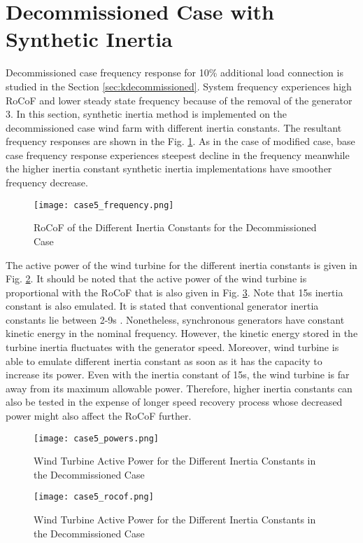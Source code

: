 \section{Decommissioned Case with Synthetic Inertia}
Decommissioned case frequency response for 10\% additional load connection is studied in the Section \ref{sec:kdecommissioned}. System frequency experiences high RoCoF and lower steady state frequency because of the removal of the generator 3. In this section, synthetic inertia method  is implemented on the decommissioned case wind farm with different inertia constants. The resultant frequency responses are shown in the Fig. \ref{Case5_freq}. As in the case of modified case, base case frequency response experiences steepest decline in the frequency meanwhile the higher inertia constant synthetic inertia implementations have smoother frequency decrease.\par
\begin{figure}[h]
	\centering
	\texttt{[image: case5\_frequency.png]}
	\caption{RoCoF of the Different Inertia Constants for the Decommissioned Case}
	\label{Case5_freq}
\end{figure}
The active power of the wind turbine for the different inertia constants is given in Fig. \ref{Case5_power}. It should be noted that the active power of the wind turbine is proportional with the RoCoF that is also given in Fig. \ref{Case5_rocof}. Note that 15s inertia constant is also emulated. It is stated that conventional generator inertia constants lie between 2-9s \cite{Kundur}. Nonetheless, synchronous generators have constant kinetic energy in the nominal frequency. However, the kinetic energy stored in the turbine inertia fluctuates with the generator speed. Moreover, wind turbine is able to emulate different inertia constant as soon as it has the capacity to increase its power. Even with the inertia constant of 15s, the wind turbine is far away from its maximum allowable power. Therefore, higher inertia constants can also be tested in the expense of longer speed recovery process whose decreased power might also affect the RoCoF further. 
\begin{figure}[h]
	\centering
	\texttt{[image: case5\_powers.png]}
	\caption{Wind Turbine Active Power for the Different Inertia Constants in the Decommissioned Case}
	\label{Case5_power}
\end{figure}
\begin{figure}[h]
	\centering
	\texttt{[image: case5\_rocof.png]}
	\caption{Wind Turbine Active Power for the Different Inertia Constants in the Decommissioned Case}
	\label{Case5_rocof}
\end{figure}